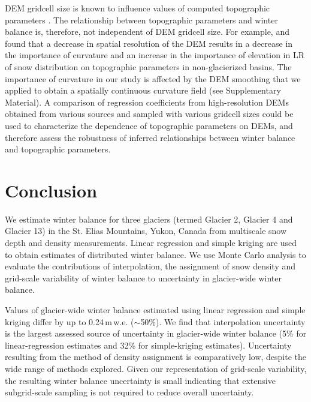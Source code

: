 \documentclass[twocolumn, letterpaper]{igs}
\begin{document}
DEM gridcell size is known to influence values of computed topographic parameters \citep{Zhang1994, Garbrecht1994, Guo-an2001, Lopez2010}. The relationship between topographic parameters and winter balance is, therefore, not independent of DEM gridcell size. For example, \cite{Kienzle2004} and \cite{Lopez2010} found that a decrease in spatial resolution of the DEM results in a decrease in the importance of curvature and an increase in the importance of elevation in LR of snow distribution on topographic parameters in non-glacierized basins. The importance of curvature in our study is affected by the DEM smoothing that we applied to obtain a spatially continuous curvature field (see Supplementary Material). A comparison of regression coefficients from high-resolution DEMs obtained from various sources and sampled with various gridcell sizes could be used to characterize the dependence of topographic parameters on DEMs, and therefore assess the robustness of inferred relationships between winter balance and topographic parameters. 


\section{Conclusion}

We estimate winter balance for three glaciers (termed Glacier 2, Glacier 4 and Glacier 13) in the St. Elias Mountains, Yukon, Canada from multiscale snow depth and density measurements. Linear regression and simple kriging are used to obtain estimates of distributed winter balance. We use Monte Carlo analysis to evaluate the contributions of interpolation, the assignment of snow density and grid-scale variability of winter balance to  uncertainty in glacier-wide winter balance. 

Values of glacier-wide winter balance estimated using linear regression and simple kriging differ by up to 0.24\,m\,w.e. ($\sim$50\%). We find that interpolation uncertainty is the largest assessed source of uncertainty in glacier-wide winter balance (5\% for linear-regression estimates and 32\% for simple-kriging estimates). Uncertainty resulting from the method of density assignment is comparatively low, despite the wide range of methods explored. Given our representation of grid-scale variability, the resulting winter balance uncertainty is small indicating that extensive subgrid-scale sampling is not required to reduce overall uncertainty. 
\end{document}
